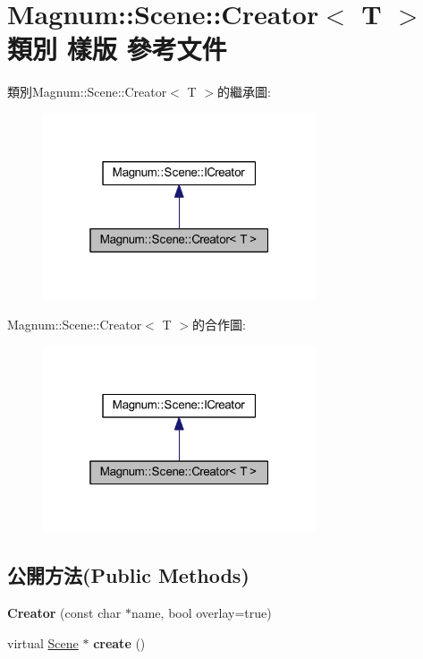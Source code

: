 \hypertarget{class_magnum_1_1_scene_1_1_creator}{}\section{Magnum\+:\+:Scene\+:\+:Creator$<$ T $>$ 類別 樣版 參考文件}
\label{class_magnum_1_1_scene_1_1_creator}


類別\+Magnum\+:\+:Scene\+:\+:Creator$<$ T $>$的繼承圖\+:\nopagebreak
\begin{figure}[H]
\begin{center}
\leavevmode
\includegraphics[width=229pt]{class_magnum_1_1_scene_1_1_creator__inherit__graph}
\end{center}
\end{figure}


Magnum\+:\+:Scene\+:\+:Creator$<$ T $>$的合作圖\+:\nopagebreak
\begin{figure}[H]
\begin{center}
\leavevmode
\includegraphics[width=229pt]{class_magnum_1_1_scene_1_1_creator__coll__graph}
\end{center}
\end{figure}
\subsection*{公開方法(Public Methods)}
\begin{DoxyCompactItemize}
\item 
{\bfseries Creator} (const char $\ast$name, bool overlay=true)\hypertarget{class_magnum_1_1_scene_1_1_creator_a9150d876699eb67e2483dab72eea173c}{}\label{class_magnum_1_1_scene_1_1_creator_a9150d876699eb67e2483dab72eea173c}

\item 
virtual \hyperlink{class_magnum_1_1_scene}{Scene} $\ast$ {\bfseries create} ()\hypertarget{class_magnum_1_1_scene_1_1_creator_adb572f7b20f644f0c388c812b450618f}{}\label{class_magnum_1_1_scene_1_1_creator_adb572f7b20f644f0c388c812b450618f}

\end{DoxyCompactItemize}
